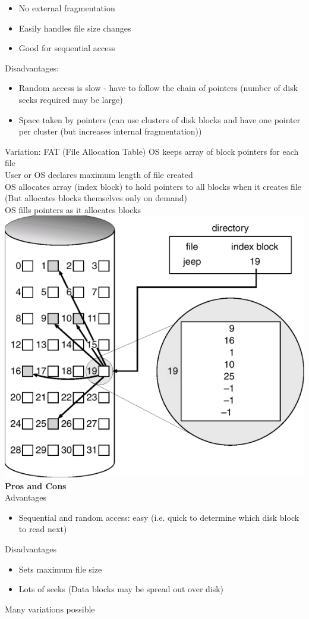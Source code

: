 \documentclass[number]{notes}
\begin{document}
\begin{landscape}
\begin{multicols}{3}
\begin{itemize}[nolistsep]
    \item No external fragmentation
    \item Easily handles file size changes
    \item Good for sequential access
\end{itemize}
Disadvantages:
\begin{itemize}[nolistsep]
    \item Random access is slow - have to follow the chain of pointers (number of disk seeks required may be large)
    \item Space taken by pointers (can use clusters of disk blocks and have one pointer per cluster (but increases internal fragmentation))
\end{itemize}
Variation: FAT (File Allocation Table)
OS keeps array of block pointers for each file\\
User or OS declares maximum length of file created\\
OS allocates array (index block) to hold pointers to all blocks when it creates file (But allocates blocks themselves only on demand)\\
OS fills pointers as it allocates blocks
\includegraphics[width=\linewidth]{indexAllocation.png}
\textbf{Pros and Cons}\\
Advantages
\begin{itemize}[nolistsep]
    \item Sequential and random access: easy (i.e. quick to determine which disk block to read next)
\end{itemize}
Disadvantages
\begin{itemize}[nolistsep]
    \item Sets maximum file size
    \item Lots of seeks (Data blocks may be spread out over disk)
\end{itemize}
Many variations possible


\end{multicols}
\end{landscape}
\end{document}

